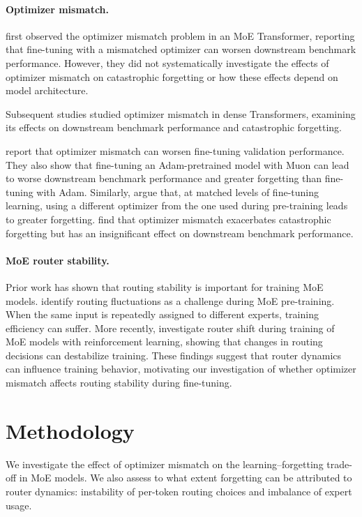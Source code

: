\documentclass[11pt,a4paper]{article}
\begin{document}
\paragraph{Optimizer mismatch.}
\cite{liu2025muon} first observed the optimizer mismatch problem in an MoE Transformer, reporting that fine-tuning with a mismatched optimizer can worsen downstream benchmark performance. However, they did not systematically investigate the effects of optimizer mismatch on catastrophic forgetting or how these effects depend on model architecture.

Subsequent studies \cite{liu2026consistency, zhao2026ephemeral, qu2026canmuon} studied optimizer mismatch in dense Transformers, examining its effects on downstream benchmark performance and catastrophic forgetting.

\cite{qu2026canmuon} report that optimizer mismatch can worsen fine-tuning validation performance. They also show that fine-tuning an Adam-pretrained model with Muon can lead to worse downstream benchmark performance and greater forgetting than fine-tuning with Adam.
Similarly, \cite{liu2026consistency} argue that, at matched levels of fine-tuning learning, using a different optimizer from the one used during pre-training leads to greater forgetting. \cite{zhao2026ephemeral} find that optimizer mismatch exacerbates catastrophic forgetting but has an insignificant effect on downstream benchmark performance. 

\paragraph{MoE router stability.} Prior work has shown that routing stability is important for training MoE models. \cite{dai2022stablemoestableroutingstrategy} identify routing fluctuations as a challenge during MoE pre-training. When the same input is repeatedly assigned to different experts, training efficiency can suffer. More recently, \cite{zhang2026stableeffectivereinforcementlearning} investigate router shift during training of MoE models with reinforcement learning, showing that changes in routing decisions can destabilize training. These findings suggest that router dynamics can influence training behavior, motivating our investigation of whether optimizer mismatch affects routing stability during fine-tuning. 

\section{Methodology}
\label{sec:methodology}
We investigate the effect of optimizer mismatch on the learning--forgetting trade-off in MoE models. We also assess to what extent forgetting can be attributed to router dynamics: instability of per-token routing choices and imbalance of expert usage. 
\end{document}
